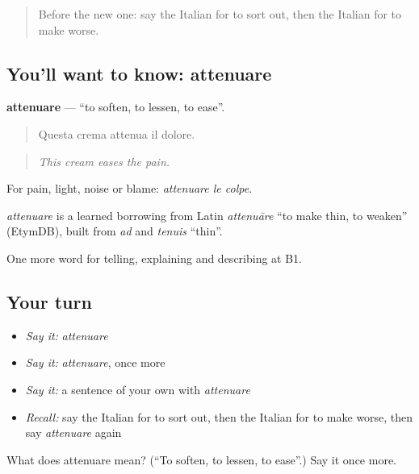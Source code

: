 \begin{quote}
Before the new one: say the Italian for to sort out, then the Italian for to make worse.
\end{quote}

\subsection*{You'll want to know: attenuare}
\textbf{attenuare} — \textquotedblleft{}to soften, to lessen, to ease\textquotedblright{}.

\begin{quote}
Questa crema attenua il dolore.
\end{quote}

\begin{quote}
\emph{This cream eases the pain.}
\end{quote}

For pain, light, noise or blame: \emph{attenuare le colpe}.

\begin{cousinweb}
\emph{attenuare} is a learned borrowing from Latin \emph{attenuāre} \textquotedblleft{}to make thin, to weaken\textquotedblright{} (EtymDB), built from \emph{ad} and \emph{tenuis} \textquotedblleft{}thin\textquotedblright{}.
\end{cousinweb}

\begin{grammarlens}[title={What you've built}]
One more word for telling, explaining and describing at B1.
\end{grammarlens}

\subsection*{Your turn}
\begin{itemize}
\raggedright
  \item \emph{Say it:} \emph{attenuare}
  \item \emph{Say it:} \emph{attenuare}, once more
  \item \emph{Say it:} a sentence of your own with \emph{attenuare}
  \item \emph{Recall:} say the Italian for to sort out, then the Italian for to make worse, then say \emph{attenuare} again
\end{itemize}

\begin{tcolorbox}[breakable,colback=teal!4,colframe=teal!35!black,title={Before you move on}]
What does attenuare mean? (\textquotedblleft{}To soften, to lessen, to ease\textquotedblright{}.) Say it once more.
\end{tcolorbox}
